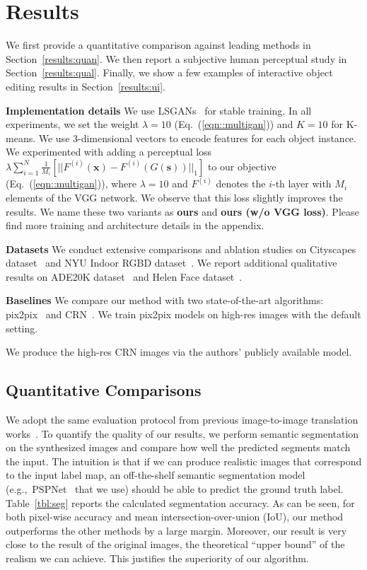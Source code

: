 \section{Results} \label{sec:results}

We first provide a quantitative comparison against leading methods in Section~\ref{results:quan}. We then report a subjective human perceptual study in Section~\ref{results:qual}. Finally, we show a few examples of interactive object editing results in Section~\ref{results:ui}. 

{ \bf Implementation details} We use LSGANs~\cite{mao2017least} for stable training. In all experiments, we set the weight ${\lambda=10}$ (Eq.~(\ref{eqn::multigan})) and ${K=10}$ for K-means. We use $3$-dimensional vectors to encode features for each object instance. We experimented with adding a perceptual loss $\lambda \sum_{i=1}^N\frac{1}{M_i}[||F^{(i)}(\mathbf{x})-F^{(i)}(G(\mathbf{s}))||_1]$ to our objective (Eq.~(\ref{eqn::multigan})), where $\lambda=10$ and $F^{(i)}$ denotes the $i$-th layer with $M_i$  elements of the VGG network. We observe that this loss slightly improves the results. We name these two variants as \textbf{ours} and \textbf{ours (w/o VGG loss)}. Please find more training and architecture details in the appendix.

{ \bf Datasets} We conduct extensive comparisons and ablation studies on Cityscapes dataset~\cite{Cordts2016cityscapes} and NYU Indoor RGBD dataset~\cite{Silberman2012indoor}. We report additional qualitative results on ADE20K dataset~\cite{zhou2017scene} and Helen Face dataset~\cite{le2012interactive,smith2013exemplar}.

{ \bf Baselines} We compare our method with two state-of-the-art algorithms: pix2pix~\cite{isola2016image} and CRN~\cite{chen2017photographic}. We train pix2pix models on high-res images with the default setting. 

We produce the high-res CRN images via the authors' publicly available model.

\subsection{Quantitative Comparisons} \label{sec:results:quan}

We adopt the same evaluation protocol from previous image-to-image translation works~\cite{isola2016image,zhu2017unpaired}. To quantify the quality of our results, we perform semantic segmentation on the synthesized images and compare how well the predicted segments match the input. The intuition is that if we can produce realistic images that correspond to the input label map, an off-the-shelf semantic segmentation model (e.g.,\ PSPNet~\cite{zhao2017pspnet} that we use) should be able to predict the ground truth label. Table~\ref{tbl:seg} reports the calculated segmentation accuracy. As can be seen, for both pixel-wise accuracy and mean intersection-over-union (IoU), our method outperforms the other methods by a large margin. Moreover, our result is very close to the result of the original images, the theoretical ``upper bound'' of the realism we can achieve. This justifies the superiority of our algorithm.

